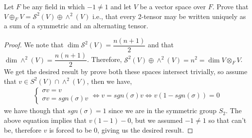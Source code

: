 \documentclass[11pt]{article}
\newenvironment{problem}[2][Problem\!]{\begin{tcolorbox}\begin{trivlist}
\item[\hskip \labelsep {\bfseries #1}\hskip \labelsep {\bfseries #2}]}{\end{trivlist}\end{tcolorbox}}
\begin{document}
\begin{problem} {11.5.13}
    Let $F$ be any field in which $-1 \neq 1$ and let $V$ be a vector space over $F.$ Prove that $V \oplus_F V = \mathcal{S}^{2}(V)\oplus \wedge^{2}(V)$ i.e., that every 2-tensor may be written uniquely as a sum of a symmetric and an alternating tensor. 
\end{problem}
\begin{proof}
    We note that $\dim\mathcal{S}^{2}(V) = \dfrac{n(n+1)}{2}$ and that $\dim \wedge^{2}(V) = \dfrac{n(n+1)}{2}$. Therefore, $\mathcal{S}^{2}(V)\oplus \wedge^{2}(V) = n^{2} = \dim V \otimes_F V$. We get the desired result by prove both these spaces intersect trivially, so assume that $v \in S^{2}(V)\cap \wedge^{2}(V)$, then we have,
    \begin{align*}
        \begin{cases}
            \sigma v = v \\
            \sigma v = sgn(\sigma)v
        \end{cases} \iff v = sgn(\sigma) v \iff v(1-sgn(\sigma)) = 0
    \end{align*}
    we have though that $sgn(\sigma) =1$ since we are in the symmetric group $S_2$. The above equation implies that $v(1 - 1) - 0$, but we assumed $-1 \neq 1$ so that can't be, therefore $v$ is forced to be 0, giving us the desired result. 
\end{proof}
\end{document}
